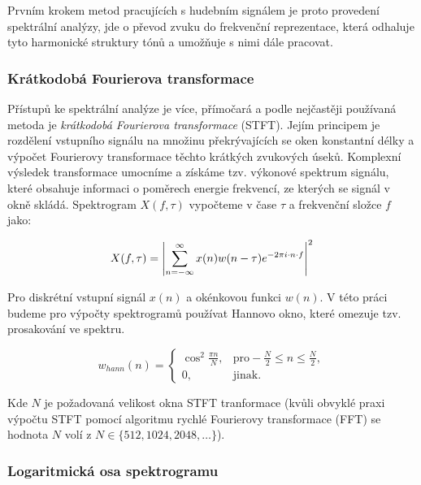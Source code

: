 Prvním krokem metod pracujících s hudebním signálem je proto provedení spektrální analýzy, jde o převod zvuku do frekvenční reprezentace, která odhaluje tyto harmonické struktury tónů a umožňuje s nimi dále pracovat. 

\subsubsection{Krátkodobá Fourierova transformace}

Přístupů ke spektrální analýze je více, přímočará a podle \cite{Dressler2016} nejčastěji používaná metoda je \emph{krátkodobá Fourierova transformace} (STFT). Jejím principem je rozdělení vstupního signálu na množinu překrývajících se oken konstantní délky a výpočet Fourierovy transformace těchto krátkých zvukových úseků. Komplexní výsledek transformace umocníme a získáme tzv. výkonové spektrum signálu, které obsahuje informaci o poměrech energie frekvencí, ze kterých se signál v okně skládá. Spektrogram $X(f, \tau)$ vypočteme v čase $\tau$ a frekvenční složce $f$ jako:


$$ X(f, \tau) = \left|{\sum^{\infty}_{n=-\infty}{x(n)w(n-\tau)e^{-2\pi i \cdot n \cdot f}}}\right|^2 $$

Pro diskrétní vstupní signál $x(n)$ a okénkovou funkci $w(n)$. V této práci budeme pro výpočty spektrogramů používat Hannovo okno, které omezuje tzv. prosakování ve spektru. 

\[
w_{hann}(n) =
\begin{cases}
    \cos^2{\frac{\pi n}{N}}, & \text{pro} -\frac{N}{2} \leq n \leq \frac{N}{2},\\
    0, & \text{jinak}.
\end{cases}
\]

Kde $N$ je požadovaná velikost okna STFT tranformace (kvůli obvyklé praxi výpočtu STFT pomocí algoritmu rychlé Fourierovy transformace (FFT) se hodnota $N$ volí z $N \in \{512, 1024, 2048, \dots\}$).

\subsubsection{Logaritmická osa spektrogramu}

